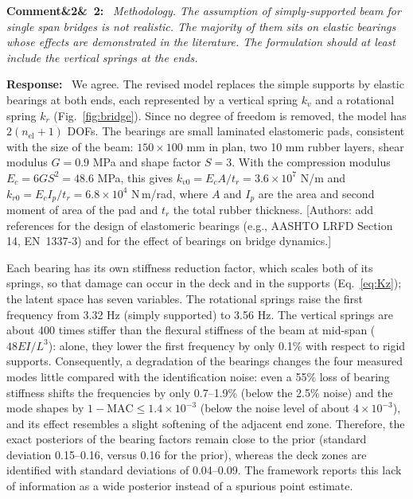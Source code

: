 \documentclass[11pt]{article}
\newenvironment{rcomment}[1]{\par\bigskip\noindent\textbf{Comment\ifx&#1&\else\ #1\fi:}\ \itshape}{\par}
\newenvironment{response}{\par\smallskip\noindent\color{resp}\textbf{Response:}\ }{\par}
\newcommand{\authornote}[1]{\textcolor{note}{\textsf{[Authors: #1]}}}
\begin{document}
\begin{rcomment}{2}
Methodology. The assumption of simply-supported beam for single span bridges is not realistic. The majority of them
sits on elastic bearings whose effects are demonstrated in the literature. The formulation should at least include the
vertical springs at the ends.
\end{rcomment}

\begin{response}
We agree. The revised model replaces the simple supports by elastic bearings at both ends, each represented by a
vertical spring $k_v$ and a rotational spring $k_r$ (Fig.~\ref{fig:bridge}). Since no degree of freedom is removed, the
model has $2(n_{\mathrm{el}}+1)$ DOFs. The bearings are small laminated elastomeric pads, consistent with the size of
the beam: $150\times100$ mm in plan, two 10 mm rubber layers, shear modulus $G=0.9$ MPa and shape factor $S=3$. With the
compression modulus $E_c=6GS^2=48.6$ MPa, this gives $k_{v0}=E_cA/t_r=3.6\times10^{7}$ N/m and
$k_{r0}=E_cI_p/t_r=6.8\times10^{4}$ N\,m/rad, where $A$ and $I_p$ are the area and second moment of area of the pad
and $t_r$ the total rubber thickness. \authornote{add references for the design of elastomeric bearings (e.g., AASHTO
LRFD Section 14, EN~1337-3) and for the effect of bearings on bridge dynamics.}

Each bearing has its own stiffness reduction factor, which scales both of its springs, so that damage can occur in the
deck and in the supports (Eq.~\eqref{eq:Kz}); the latent space has seven variables. The rotational springs raise the
first frequency from 3.32 Hz (simply supported) to 3.56 Hz. The vertical springs are about 400 times stiffer than the
flexural stiffness of the beam at mid-span ($48EI/L^3$): alone, they lower the first frequency by only 0.1\% with
respect to rigid supports. Consequently, a degradation of the bearings changes the four measured modes little compared
with the identification noise: even a 55\% loss of bearing stiffness shifts the frequencies by only 0.7--1.9\% (below
the 2.5\% noise) and the mode shapes by $1-\mathrm{MAC}\le1.4\times10^{-3}$ (below the noise level of about
$4\times10^{-3}$), and its effect resembles a slight softening of the adjacent end zone. Therefore, the exact posteriors of the bearing factors remain close to the prior (standard
deviation 0.15--0.16, versus 0.16 for the prior), whereas the deck zones are identified with standard deviations of
0.04--0.09. The framework reports this lack of information as a wide posterior instead of a spurious point estimate.


\end{response}
\end{document}
